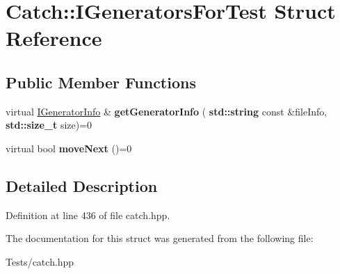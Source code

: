 \hypertarget{struct_catch_1_1_i_generators_for_test}{}\section{Catch\+:\+:I\+Generators\+For\+Test Struct Reference}
\label{struct_catch_1_1_i_generators_for_test}
\subsection*{Public Member Functions}
\begin{DoxyCompactItemize}
\item 
\mbox{\label{struct_catch_1_1_i_generators_for_test_a180d84e858840188e4c3788e47eefdb0}} 
virtual \hyperlink{struct_catch_1_1_i_generator_info}{I\+Generator\+Info} \& {\bfseries get\+Generator\+Info} (\textbf{ std\+::string} const \&file\+Info, \textbf{ std\+::size\+\_\+t} size)=0
\item 
\mbox{\label{struct_catch_1_1_i_generators_for_test_adab31832d529fc584fd63164e0a1c8ad}} 
virtual bool {\bfseries move\+Next} ()=0
\end{DoxyCompactItemize}


\subsection{Detailed Description}


Definition at line 436 of file catch.\+hpp.



The documentation for this struct was generated from the following file\+:\begin{DoxyCompactItemize}
\item 
Tests/catch.\+hpp\end{DoxyCompactItemize}

